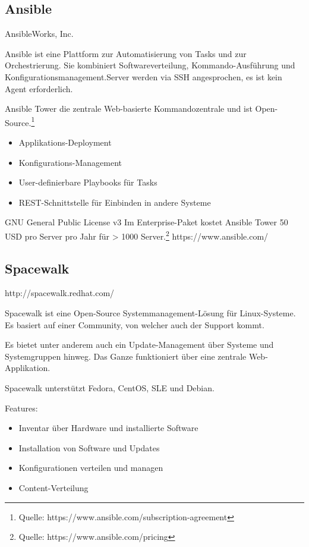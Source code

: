 \subsection{Ansible}

{AnsibleWorks, Inc.}
{Ansible ist eine Plattform zur Automatisierung von Tasks und zur Orchestrierung. Sie kombiniert Softwareverteilung, Kommando-Ausführung und Konfigurationsmanagement.Server werden via SSH angesprochen, es ist kein Agent erforderlich.

Ansible Tower die zentrale Web-basierte Kommandozentrale und ist Open-Source.\footnote{Quelle: https://www.ansible.com/subscription-agreement}}
{\begin{itemize}
\item Applikations-Deployment
\item Konfigurations-Management
\item User-definierbare Playbooks für Tasks
\item REST-Schnittstelle für Einbinden in andere Systeme
\end{itemize}}
{GNU General Public License v3}
{Im Enterprise-Paket kostet Ansible Tower 50 USD pro Server pro Jahr für > 1000 Server.\footnote{Quelle: https://www.ansible.com/pricing}}
{https://www.ansible.com/}


\subsection{Spacewalk}

http://spacewalk.redhat.com/

Spacewalk ist eine Open-Source Systemmanagement-Lösung für Linux-Systeme. Es basiert auf einer Community, von welcher auch der Support kommt.

Es bietet unter anderem auch ein Update-Management über Systeme und Systemgruppen hinweg. Das Ganze funktioniert über eine zentrale Web-Applikation.

Spacewalk unterstützt Fedora, CentOS, SLE und Debian.

Features:

\begin{itemize}
\item Inventar über Hardware und installierte Software
\item Installation von Software und Updates
\item Konfigurationen verteilen und managen
\item Content-Verteilung
\end{itemize}

